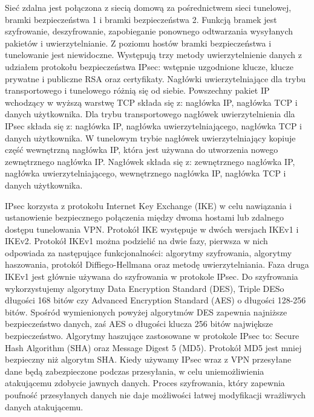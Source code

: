 \documentclass[12p]{article}
\begin{document}
\quad Sieć zdalna jest połączona z siecią domową za pośrednictwem sieci tunelowej, bramki bezpieczeństwa 1 i bramki bezpieczeństwa 2. Funkcją bramek jest szyfrowanie, deszyfrowanie, zapobieganie ponownego odtwarzania wysyłanych pakietów i uwierzytelnianie. Z poziomu hostów bramki bezpieczeństwa i tunelowanie jest niewidoczne. Występują trzy metody uwierzytelnienie danych z udziałem protokołu bezpieczeństwa IPsec: wstępnie uzgodnione klucze, klucze prywatne i publiczne RSA oraz certyfikaty. Nagłówki uwierzytelniające dla trybu transportowego i tunelowego różnią się od siebie. Powszechny pakiet IP wchodzący w wyższą warstwę TCP składa się z: nagłówka IP, nagłówka TCP i danych użytkownika. Dla trybu transportowego nagłówek uwierzytelnienia dla IPsec składa się z: nagłówka IP, nagłówka uwierzytelniającego, nagłówka TCP i danych użytkownika. W tunelowym trybie nagłówek uwierzytelniający kopiuje część wewnętrzną nagłówka IP, która jest używana do utworzenia nowego zewnętrznego nagłówka IP. Nagłówek składa się z: zewnętrznego nagłówka IP, nagłówka uwierzytelniającego, wewnętrznego nagłówka IP, nagłówka TCP i danych użytkownika.

IPsec korzysta z protokołu Internet Key Exchange (IKE) w celu nawiązania i ustanowienie bezpiecznego połączenia między dwoma hostami lub zdalnego dostępu tunelowania VPN. Protokół IKE występuje w dwóch wersjach IKEv1 i IKEv2. Protokół IKEv1 można podzielić na dwie fazy, pierwsza w nich odpowiada za następujące funkcjonalności: algorytmy szyfrowania, algorytmy haszowania, protokół Diffiego-Hellmana oraz metodę uwierzytelniania.  Faza druga IKEv1 jest głównie używana do szyfrowania w protokole IPsec. Do szyfrowania wykorzystujemy algorytmy Data Encryption Standard (DES),  Triple DESo długości 168 bitów czy Advanced Encryption Standard (AES) o długości 128-256 bitów. Spośród wymienionych powyżej algorytmów DES zapewnia najniższe bezpieczeństwo danych, zaś AES o długości klucza 256 bitów największe bezpieczeństwo. Algorytmy haszujące zastosowane w protokole IPsec to: Secure Hash Algorithm (SHA) oraz Message Digest 5 (MD5). Protokół MD5 jest mniej bezpieczny niż algorytm SHA.
Kiedy używamy IPsec wraz z VPN przesyłane dane będą zabezpieczone podczas przesyłania, w celu uniemożliwienia atakującemu zdobycie jawnych danych.  Proces szyfrowania, który zapewnia poufność przesyłanych danych nie daje możliwości łatwej modyfikacji wrażliwych danych atakującemu.
\end{document}
